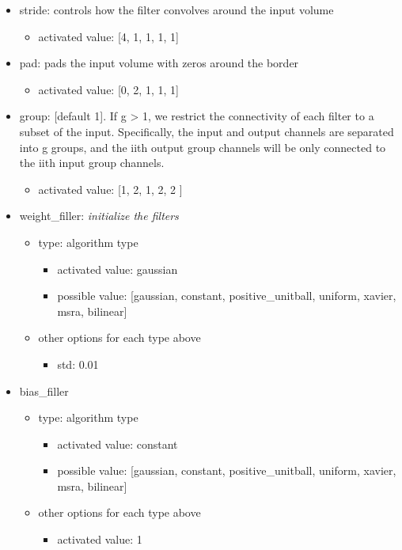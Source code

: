 \documentclass[11pt]{article}
\begin{document}
\begin{itemize}
\begin{itemize}
		\item stride: controls how the filter convolves around the input volume
			\begin{itemize}
				\item activated value: [4, 1, 1, 1, 1]
			\end{itemize}
		\item pad: pads the input volume with zeros around the border
		\begin{itemize}
			\item activated value: [0, 2, 1, 1, 1]
		\end{itemize}
		\item group: [default 1]. If g > 1, we restrict the connectivity of each filter to a subset of the input. Specifically, the input and output channels are separated into g groups, and the iith output group channels will be only connected to the iith input group channels.
		\begin{itemize}
			\item activated value: [1, 2, 1, 2, 2 ]
		\end{itemize}
		\item weight\_filler: \textit{initialize the filters}
		\begin{itemize}
			\item type: algorithm type
			\begin{itemize}
				\item activated value: gaussian
				\item possible value: [gaussian, constant, positive\_unitball, uniform, xavier, msra, bilinear]
			\end{itemize}
			\item other options for each type above
			\begin{itemize}
				\item std: 0.01
			\end{itemize}
		\end{itemize}
		\item bias\_filler
		\begin{itemize}
			\item type: algorithm type
			\begin{itemize}
				\item activated value: constant
				\item possible value: [gaussian, constant, positive\_unitball, uniform, xavier, msra, bilinear]
			\end{itemize}
			\item other options for each type above
			\begin{itemize}
				\item activated value: 1
			\end{itemize}
		\end{itemize}
	\end{itemize}
\end{itemize}
\end{document}
